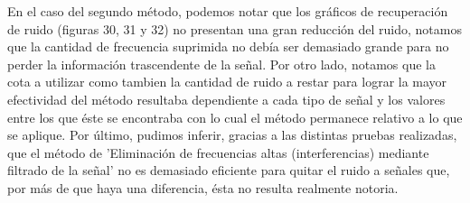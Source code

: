 \documentclass[10pt, a4paper]{article}
\begin{document}
\begin{itemize}
\newline
En el caso del segundo método, podemos notar que los gráficos de recuperación de ruido (figuras 30, 31 y 32) no presentan una gran reducción del ruido, notamos que la cantidad de frecuencia suprimida no debía ser demasiado grande para no perder la información trascendente de la señal. Por otro lado, notamos que la cota a utilizar como tambien la cantidad de ruido a restar para lograr la mayor efectividad del método resultaba dependiente a cada tipo de señal y los valores entre los que éste se encontraba con lo cual el método permanece relativo a lo que se aplique. Por último, pudimos inferir, gracias a las distintas pruebas realizadas, que el método de 'Eliminación de frecuencias altas (interferencias) mediante filtrado de la señal' no es demasiado eficiente para quitar el ruido a señales que, por más de que haya una diferencia, ésta no resulta realmente notoria.


\end{itemize}
\end{document}
